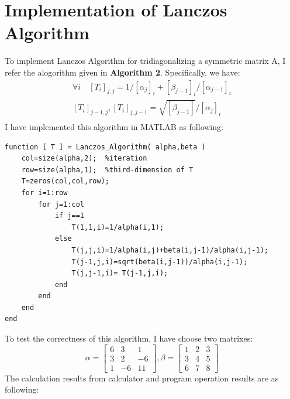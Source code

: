 \documentclass{article} %
\begin{document}
\section{Implementation of Lanczos Algorithm}
To implement Lanczos Algorithm for tridiagonalizing a symmetric matrix A, I refer the alogorithm given in \textbf{Algorithm 2}. Specifically,
we have:\\
\begin{equation}
\begin{aligned}
\forall i \quad [T_i]_{j,j}=1/[\alpha_j]_i+[\beta_{j-1}]_i/[\alpha_{j-1}]_i \\
[T_i]_{j-1,j}, [T_i]_{j,j-1}=\sqrt{[\beta_{j-1}]}/[\alpha_{j}]_i \\
\end{aligned}
\end{equation}
I have implemented this algorithm in MATLAB as following:
\begin{lstlisting}
function [ T ] = Lanczos_Algorithm( alpha,beta )
	col=size(alpha,2);  %iteration
	row=size(alpha,1);  %third-dimension of T
	T=zeros(col,col,row);
	for i=1:row
		for j=1:col
			if j==1
				T(1,1,i)=1/alpha(i,1);
			else
				T(j,j,i)=1/alpha(i,j)+beta(i,j-1)/alpha(i,j-1);
				T(j-1,j,i)=sqrt(beta(i,j-1))/alpha(i,j-1);
				T(j,j-1,i)= T(j-1,j,i);
			end
		end
	end
end
\end{lstlisting}
To test the correctness of this algorithm, I have choose two matrixes:
\begin{equation}
\alpha={
	\left[ \begin{array}{ccc}
	6 & 3 & 1\\
	3 & 2 & -6\\
	1 & -6 & 11
	\end{array} 
	\right ]},
\beta={
	\left[ \begin{array}{ccc}
	1 & 2 & 3\\
	3& 4 & 5\\
	6 & 7 & 8
	\end{array}
	\right ]}
\end{equation}
The calculation results from calculator and program operation results are as following:
\end{document}
